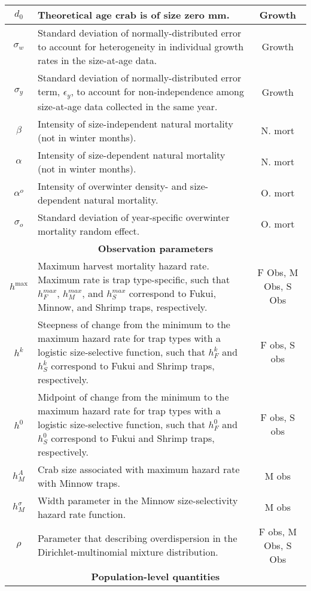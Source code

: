 \documentclass{article}
\begin{document}
\begin{longtable}{||c p{9cm} c||}
 \hline
 $d_0$ & Theoretical age crab is of size zero mm. & Growth \\ 
 \hline
 $\sigma_w$ & Standard deviation of normally-distributed error to account for heterogeneity in individual growth rates in the size-at-age data. & Growth \\ 
 \hline
 $\sigma_y$ & Standard deviation of normally-distributed error term, $\epsilon_y$, to account for non-independence among size-at-age data collected in the same year. & Growth \\ 
 \hline
 $\beta$ & Intensity of size-independent natural mortality (not in winter months). & N. mort \\ 
 \hline
 $\alpha$ & Intensity of size-dependent natural mortality (not in winter months). & N. mort \\ 
 \hline
 $\alpha^o$ & Intensity of overwinter density- and size-dependent natural mortality. & O. mort \\ 
 \hline
 \hline
 $\sigma_o$ & Standard deviation of year-specific overwinter mortality random effect. & O. mort \\ 
 \hline\hline
 \multicolumn{3}{||c||}{\textbf{Observation parameters}} \\ 
 \hline
 $h^{\text{max}}$ & Maximum harvest mortality hazard rate. Maximum rate is trap type-specific, such that $h_F^{max}$, $h_M^{max}$, and $h_S^{max}$ correspond to Fukui, Minnow, and Shrimp traps, respectively. & F Obs, M Obs, S Obs \\ 
 \hline
 $h^{k}$ & Steepness of change from the minimum to the maximum hazard rate for trap types with a logistic size-selective function, such that $h_F^{k}$ and $h_S^{k}$ correspond to Fukui and Shrimp traps, respectively. & F obs, S obs \\ 
 \hline
 $h^{0}$ & Midpoint of change from the minimum to the maximum hazard rate for trap types with a logistic size-selective function, such that $h_F^{0}$ and $h_S^{0}$ correspond to Fukui and Shrimp traps, respectively. & F obs, S obs \\ 
 \hline
 $h_M^{A}$ & Crab size associated with maximum hazard rate with Minnow traps. & M obs \\ 
 \hline
 $h_M^{\sigma}$ & Width parameter in the Minnow size-selectivity hazard rate function. & M obs \\ 
 \hline
 $\rho$ & Parameter that describing overdispersion in the Dirichlet-multinomial mixture distribution. & F obs, M Obs, S Obs \\
 \hline\hline
 \multicolumn{3}{||c||}{\textbf{Population-level quantities}} \\ 

\end{longtable}
\end{document}
